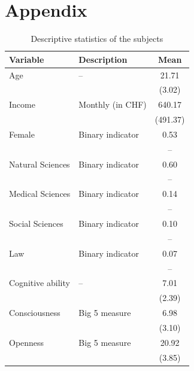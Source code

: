 \documentclass[11pt,a4paper]{article}
\theoremstyle{definition}
\begin{document}
% 


\clearpage
\appendix
\section{Appendix}
\label{sec:org5e6d1d5}
\begin{table}[!ht]
\caption{Descriptive statistics of the subjects}
\label{tab:summary}
\centering
\begin{threeparttable}
\begin{footnotesize}
\begin{tabular}{@{}llc@{}}
\toprule
\toprule
Variable          & Description & Mean     \\ \midrule
Age               &     --        & 21.71    \\
                  &             & (3.02)   \\
Income            &    Monthly (in CHF)         & 640.17   \\
                  &             & (491.37) \\
Female            &    Binary indicator         & 0.53     \\
                  &             &      --    \\
Natural Sciences  &      Binary indicator       & 0.60     \\
                  &             &     --    \\
Medical Sciences  &       Binary indicator      & 0.14     \\
                  &             &        --  \\
Social Sciences   &     Binary indicator        & 0.10     \\
                  &             &      --    \\
Law               &     Binary indicator        & 0.07     \\
                  &             &      --    \\
Cognitive ability &   --          & 7.01     \\
                  &             & (2.39)   \\
Consciousness     &     Big 5 measure        & 6.98     \\
                  &             & (3.10)   \\
Openness          &       Big 5 measure      & 20.92    \\
                  &             & (3.85)   \\

\end{tabular}
\end{footnotesize}
\end{threeparttable}
\end{table}
\end{document}
